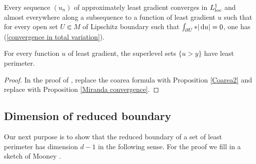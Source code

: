 \begin{corollary}\label{compactness}
Every sequence $(u_n)$ of approximately least gradient converges in $L^1_{\mathrm{loc}}$ and almost everywhere along a subsequence to a function of least gradient $u$ such that for every open set $U \Subset M$ of Lipschitz boundary such that $\int_{\partial U} *|\mathop{}\!\mathrm{d} u| = 0$, one has (\ref{convergence in total variation}).
\end{corollary}

\begin{proposition}\label{level sets are minimal}
For every function $u$ of least gradient, the superlevel sets $\{u > y\}$ have least perimeter.
\end{proposition}
\begin{proof}
In the proof of \cite[Theorem 1]{BOMBIERI1969}, replace the coarea formula \cite[Theorem 1.6]{Miranda66} with Proposition \ref{Coarea2} and replace \cite[Teorema 3]{Miranda67} with Proposition \ref{Miranda convergence}.
\end{proof}


\subsection{Dimension of reduced boundary}
Our next purpose is to show that the reduced boundary of a set of least perimeter has dimension $d - 1$ in the following sense.
For the proof we fill in a sketch of Mooney \cite[Theorem 12]{Mooney11}.

